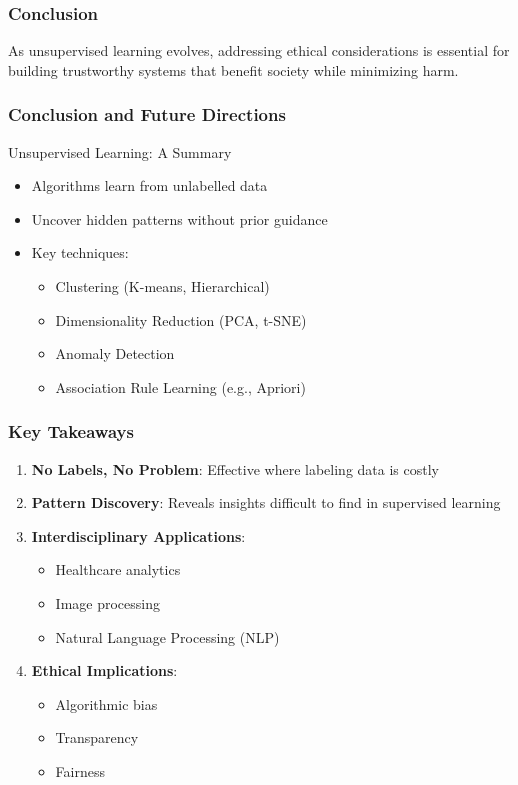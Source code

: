 \documentclass[aspectratio=169]{beamer}
\begin{document}
\begin{frame}[fragile]
    \frametitle{Conclusion}
    As unsupervised learning evolves, addressing ethical considerations is essential for building trustworthy systems that benefit society while minimizing harm.
\end{frame}

\begin{frame}[fragile]
    \frametitle{Conclusion and Future Directions}
    \begin{block}{Unsupervised Learning: A Summary}
        \begin{itemize}
            \item Algorithms learn from unlabelled data
            \item Uncover hidden patterns without prior guidance
            \item Key techniques:
            \begin{itemize}
                \item Clustering (K-means, Hierarchical)
                \item Dimensionality Reduction (PCA, t-SNE)
                \item Anomaly Detection
                \item Association Rule Learning (e.g., Apriori)
            \end{itemize}
        \end{itemize}
    \end{block}
\end{frame}

\begin{frame}[fragile]
    \frametitle{Key Takeaways}
    \begin{enumerate}
        \item \textbf{No Labels, No Problem}: Effective where labeling data is costly
        \item \textbf{Pattern Discovery}: Reveals insights difficult to find in supervised learning
        \item \textbf{Interdisciplinary Applications}: 
        \begin{itemize}
            \item Healthcare analytics
            \item Image processing
            \item Natural Language Processing (NLP)
        \end{itemize}
        \item \textbf{Ethical Implications}: 
        \begin{itemize}
            \item Algorithmic bias
            \item Transparency
            \item Fairness
        \end{itemize}
    \end{enumerate}
\end{frame}
\end{document}
